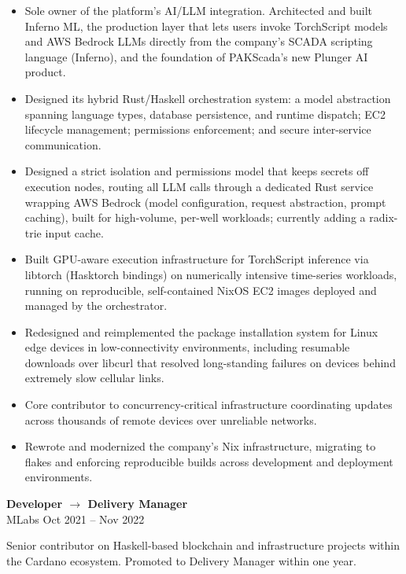\documentclass[10.5pt]{article}
\begin{document}
\begin{itemize}
    \item Sole owner of the platform's AI/LLM integration. Architected and built Inferno ML, the production layer that lets users invoke TorchScript models and AWS Bedrock LLMs directly from the company's SCADA scripting language (Inferno), and the foundation of PAKScada's new Plunger AI product.
    \item Designed its hybrid Rust/Haskell orchestration system: a model abstraction spanning language types, database persistence, and runtime dispatch; EC2 lifecycle management; permissions enforcement; and secure inter-service communication.
    \item Designed a strict isolation and permissions model that keeps secrets off execution nodes, routing all LLM calls through a dedicated Rust service wrapping AWS Bedrock (model configuration, request abstraction, prompt caching), built for high-volume, per-well workloads; currently adding a radix-trie input cache.
    \item Built GPU-aware execution infrastructure for TorchScript inference via libtorch (Hasktorch bindings) on numerically intensive time-series workloads, running on reproducible, self-contained NixOS EC2 images deployed and managed by the orchestrator.
    \item Redesigned and reimplemented the package installation system for Linux edge devices in low-connectivity environments, including resumable downloads over libcurl that resolved long-standing failures on devices behind extremely slow cellular links.
    \item Core contributor to concurrency-critical infrastructure coordinating updates across thousands of remote devices over unreliable networks.
    \item Rewrote and modernized the company's Nix infrastructure, migrating to flakes and enforcing reproducible builds across development and deployment environments.
\end{itemize}

\vspace{6pt}

\textbf{Developer $\rightarrow$ Delivery Manager} \\
MLabs \hfill Oct 2021 -- Nov 2022

Senior contributor on Haskell-based blockchain and infrastructure projects within the Cardano ecosystem. Promoted to Delivery Manager within one year.
\end{document}
